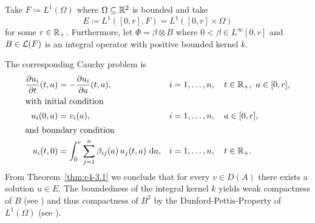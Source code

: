\begin{example}\label{ex:c4-3.13}
%
Take $F \coloneq L^{1}(\Omega)$ where $\Omega \subseteq \mathbb{R}^{2}$ is bounded and take
%
\[
	 E \coloneq L^{1}([0,r], F) = L^{1}([0,r] \times \Omega)
\]
%
for some $r \in \mathbb{R}_{+}$.
Furthermore, let $\Phi = \beta \otimes B$ where $0 < \beta \in L^{\infty}[0,r]$ and $B \in \mathcal{L}(F)$ is an integral operator with positive bounded kernel $k$.

The corresponding Cauchy problem is
\begin{align}
\frac{\partial u_i}{\partial t}(t,a)
    &= -\frac{\partial u_i}{\partial a}(t,a),
    && i=1,\ldots,n,\quad t\in\mathbb{R}_+,\ a\in[0,r], \notag\\
\intertext{with initial condition}
u_i(0,a)
    &= v_i(a),
    && i=1,\ldots,n,\quad a\in[0,r], \label{eq:c4-3.14}\\
\intertext{and boundary condition}
u_i(t,0)
    &= \int_0^r \sum_{j=1}^n \beta_{ij}(a)\,u_j(t,a)\,\mathop{}\!\mathrm{d}{a},
    && i=1,\ldots,n,\quad t\in\mathbb{R}_+. \notag
\end{align}
From Theorem~\ref{thm:c4-3.1} we conclude that for every $v \in D(A)$ there exists a solution $u \in E$.
The boundedness of the integral kernel $k$ yields weak compactness of\/ $B$ (see \textcite[Section II.5]{schaefer:1974}) and thus compactness of\/ $B^{2}$ by the Dunford-Pettis-Property of\/ $L^{1}(\Omega)$ (see \textcite[Chapter II, Theorem.9.9]{schaefer:1974}).


\end{example}

